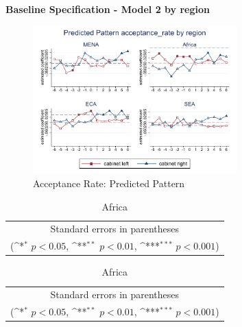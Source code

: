 \documentclass[10pt,a4paper]{scrartcl}
\begin{document}
\clearpage
\textbf{Baseline Specification - Model 2 by region}

\begin{figure}[!ht]
	\centering
	\includegraphics[width=0.7\textwidth]{figures_edited/acceptance_rate_graph2_by_region.pdf}
	\caption{Acceptance Rate: Predicted Pattern}
\end{figure}

\begin{table}[!ht]\centering
	\footnotesize
	\renewcommand{\arraystretch}{1.1}
	\def\sym#1{\ifmmode^{#1}\else\(^{#1}\)\fi}
	\caption{Acceptance Rate: Predicted Pattern}
	\begin{subtable}{.5\linewidth}
	\centering
	\caption{Middle East and North Africa}
	\begin{tabular}{l*{2}{c}}
		\hline\hline
		
		\hline\hline
		\multicolumn{3}{c}{\footnotesize Standard errors in parentheses} \\
		\multicolumn{3}{c}{\footnotesize (\sym{*} \(p<0.05\), \sym{**} \(p<0.01\), \sym{***} \(p<0.001\))}\\
	\end{tabular}
	\end{subtable}%
	\begin{subtable}{.5\linewidth}
	\centering
	\caption{Africa}
	\begin{tabular}{l*{2}{c}}
		\hline\hline
		
		\hline\hline
		\multicolumn{3}{c}{\footnotesize Standard errors in parentheses} \\
		\multicolumn{3}{c}{\footnotesize (\sym{*} \(p<0.05\), \sym{**} \(p<0.01\), \sym{***} \(p<0.001\))}\\
	\end{tabular}
	\end{subtable}%
\end{table}
\end{document}
